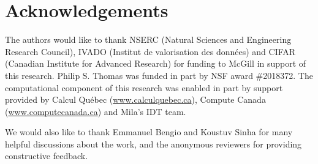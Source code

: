 \section{Acknowledgements}

The authors would like to thank NSERC (Natural Sciences and Engineering Research Council), IVADO (Institut de valorisation des données) and CIFAR (Canadian Institute for Advanced Research) for funding to McGill in support of this research. Philip S. Thomas was funded in part by NSF award \#2018372. 
The computational component of this research was enabled in part by support provided by Calcul Québec (\url{www.calculquebec.ca}), Compute Canada (\url{www.computecanada.ca}) and Mila's IDT team. 

We would also like to thank Emmanuel Bengio and Koustuv Sinha for many helpful
discussions about the work, and the anonymous reviewers for providing constructive feedback.